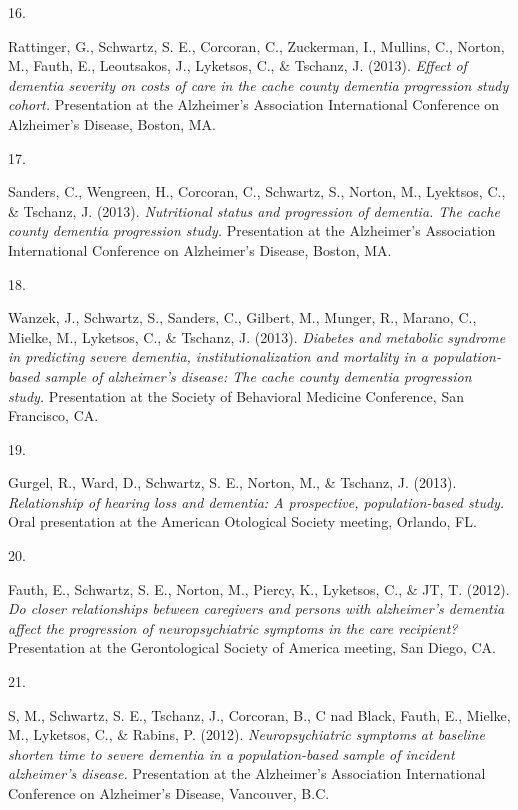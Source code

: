 \documentclass[11pt,a4paper,]{moderncv}
\newlength{\csllabelwidth}
\newcommand{\CSLLeftMargin}[1]{\parbox[t]{\csllabelwidth}{#1}}
\newcommand{\CSLRightInline}[1]{\parbox[t]{\linewidth - \csllabelwidth}{#1}}
\begin{document}
\leavevmode{}%
\CSLLeftMargin{16. }
\CSLRightInline{Rattinger, G., Schwartz, S. E., Corcoran, C., Zuckerman,
I., Mullins, C., Norton, M., Fauth, E., Leoutsakos, J., Lyketsos, C., \&
Tschanz, J. (2013). \emph{Effect of dementia severity on costs of care
in the cache county dementia progression study cohort.} Presentation at
the Alzheimer's Association International Conference on Alzheimer's
Disease, Boston, MA.}

\leavevmode{}%
\CSLLeftMargin{17. }
\CSLRightInline{Sanders, C., Wengreen, H., Corcoran, C., Schwartz, S.,
Norton, M., Lyektsos, C., \& Tschanz, J. (2013). \emph{Nutritional
status and progression of dementia. The cache county dementia
progression study.} Presentation at the Alzheimer's Association
International Conference on Alzheimer's Disease, Boston, MA.}

\leavevmode{}%
\CSLLeftMargin{18. }
\CSLRightInline{Wanzek, J., Schwartz, S., Sanders, C., Gilbert, M.,
Munger, R., Marano, C., Mielke, M., Lyketsos, C., \& Tschanz, J. (2013).
\emph{Diabetes and metabolic syndrome in predicting severe dementia,
institutionalization and mortality in a population-based sample of
alzheimer's disease: The cache county dementia progression study.}
Presentation at the Society of Behavioral Medicine Conference, San
Francisco, CA.}

\leavevmode{}%
\CSLLeftMargin{19. }
\CSLRightInline{Gurgel, R., Ward, D., Schwartz, S. E., Norton, M., \&
Tschanz, J. (2013). \emph{Relationship of hearing loss and dementia: A
prospective, population-based study.} Oral presentation at the American
Otological Society meeting, Orlando, FL.}

\leavevmode{}%
\CSLLeftMargin{20. }
\CSLRightInline{Fauth, E., Schwartz, S. E., Norton, M., Piercy, K.,
Lyketsos, C., \& JT, T. (2012). \emph{Do closer relationships between
caregivers and persons with alzheimer's dementia affect the progression
of neuropsychiatric symptoms in the care recipient?} Presentation at the
Gerontological Society of America meeting, San Diego, CA.}

\leavevmode{}%
\CSLLeftMargin{21. }
\CSLRightInline{S, M., Schwartz, S. E., Tschanz, J., Corcoran, B., C nad
Black, Fauth, E., Mielke, M., Lyketsos, C., \& Rabins, P. (2012).
\emph{Neuropsychiatric symptoms at baseline shorten time to severe
dementia in a population-based sample of incident alzheimer's disease.}
Presentation at the Alzheimer's Association International Conference on
Alzheimer's Disease, Vancouver, B.C.}
\end{document}
